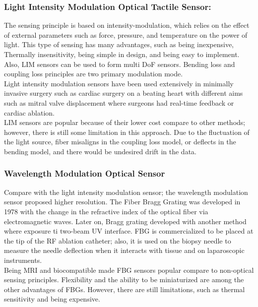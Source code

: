 \documentclass[conference]{IEEEtran}
\begin{document}
\subsubsection{Light Intensity Modulation Optical Tactile Sensor: }
The sensing principle is based on intensity-modulation, which relies on the effect of external parameters such as force, pressure, and temperature on the power of light. This type of sensing has many advantages, such as being inexpensive, Thermally insensitivity, being simple in design, and being easy to implement. Also, LIM sensors can be used to form multi DoF sensors. Bending loss and coupling loss principles are two primary modulation mode.\\ 
Light intensity modulation sensors have been used extensively in minimally invasive surgery such as cardiac surgery on a beating heart with different aims such as mitral valve displacement where surgeons had real-time feedback or cardiac ablation. \\
LIM sensors are popular because of their lower cost compare to other methods; however, there is still some limitation in this approach. Due to the fluctuation of the light source, fiber misaligns in the coupling loss model, or deflects in the bending model, and there would be undesired drift in the data. 
\subsubsection{Wavelength Modulation Optical Sensor}
Compare with the light intensity modulation sensor; the wavelength modulation sensor proposed higher resolution. The Fiber Bragg Grating was developed in 1978 with the change in the refractive index of the optical fiber via electromagnetic waves. Later on, Bragg grating developed with another method where exposure ti two-beam UV interface. FBG is commercialized to be placed at the tip of the RF ablation catheter; also, it is used on the biopsy needle to measure the needle deflection when it interacts with tissue and on laparoscopic instruments.\\ 
Being MRI and biocompatible made FBG sensors popular compare to non-optical sensing principles. Flexibility and the ability to be miniaturized are among the other advantages of FBGs. However, there are still limitations, such as thermal sensitivity and being expensive.  

\end{document}
